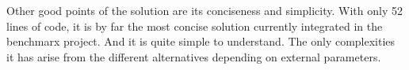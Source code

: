 \documentclass[a4paper]{article}
\begin{document}
Other good points of the solution are its conciseness and simplicity.  With
only 52 lines of code, it is by far the most concise solution currently
integrated in the benchmarx project.  And it is quite simple to understand.
The only complexities it has arise from the different alternatives depending on
external parameters.



\end{document}
